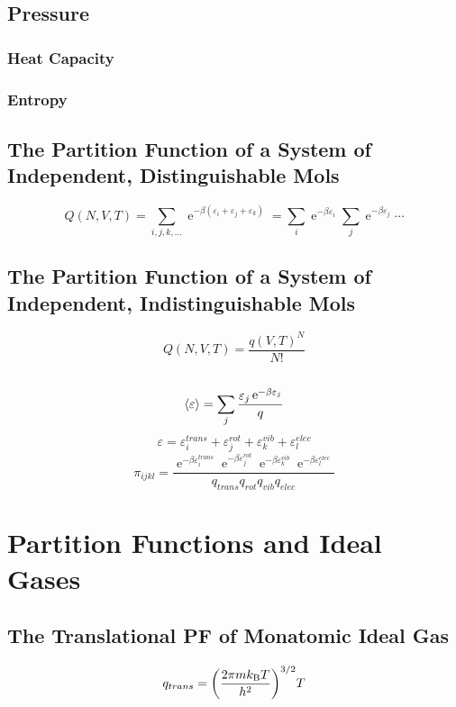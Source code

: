 \documentclass[a4paper]{article}
\DeclareMathOperator{\e}{\mathrm{e}}
\newcommand{\kB}{k_\mathrm{B}}
\numberwithin{equation}{section}
\begin{document}
\subsection{Pressure}

\subsubsection{Heat Capacity}

\subsubsection{Entropy}

\subsection{}

\subsection{The Partition Function of a System of Independent, Distinguishable Mols}
\begin{equation}\label{key}
Q(N,V,T) = \sum_{i,j,k,...} \e^{-\beta(\varepsilon_i +\varepsilon_j + \varepsilon_k)} = \sum_i\e^{-\beta\varepsilon_i} \sum_j\e^{-\beta\varepsilon_j}\cdots
\end{equation}
\subsection{The Partition Function of a System of Independent, Indistinguishable Mols}
\begin{equation}\label{key}
Q(N,V,T) = \dfrac{q(V,T)^N}{N!}
\end{equation}


\subsection{}
\begin{equation}\label{key}
\ev{\varepsilon} = \sum_j \dfrac{\varepsilon_j \e^{-\beta\varepsilon_j}}{q}
\end{equation}
\begin{equation}\label{key}
\varepsilon = \varepsilon_i^{trans} + \varepsilon_j^{rot} + \varepsilon_k^{vib} + \varepsilon_l^{elec}
\end{equation}
\begin{equation}\label{key}
\pi_{ijkl} = \dfrac{\e^{-\beta\varepsilon_i^{trans}}\e^{-\beta\varepsilon_j^{rot}} \e^{-\beta\varepsilon_k^{vib}}\e^{-\beta\varepsilon_l^{elec}}}{q_{trans}q_{rot}q_{vib}q_{elec}}
\end{equation}

\section{Partition Functions and Ideal Gases}
\subsection{The Translational PF of Monatomic Ideal Gas}
\begin{equation}\label{key}
q_{trans} = \qty(\dfrac{2\pi m \kB T}{h^2})^{3/2} T
\end{equation}
\end{document}
